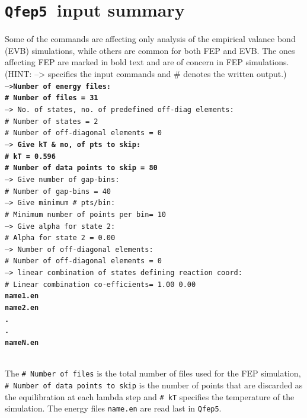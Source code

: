 \documentclass[a4paper,12pt]{article}
\newcommand{\qfep}{\texttt{Qfep5}}
\begin{document}
\section{\qfep\ input summary}

Some of the commands are affecting only analysis of the empirical
valance bond (EVB) simulations, while others are common for both
FEP and EVB. The ones affecting FEP are marked in bold text and
are of concern in FEP simulations.\\ (HINT: --> specifies the
input commands and \# denotes the written output.)\\

\noindent\texttt{-->\textbf{Number of energy files:\\
\# Number of files                 =    31}\\
--> No. of states, no. of predefined off-diag elements: \\
\# Number of states                 =     2\\
\# Number of off-diagonal elements =     0\\
--> \textbf{Give kT \& no, of pts to skip:}\\
\textbf{\# kT                              = 0.596}\\
\textbf{\# Number of data points to skip   =    80}\\
--> Give number of gap-bins: \\
\# Number of gap-bins              =    40\\
--> Give minimum \# pts/bin: \\
\# Minimum number of points per bin=    10\\
--> Give alpha for state  2:\\
\# Alpha for state  2              =  0.00\\
--> Number of off-diagonal elements:\\
\# Number of off-diagonal elements =     0\\
--> linear combination of states defining reaction coord: \\
\# Linear combination co-efficients=  1.00  0.00\\
\textbf{name1.en\\
name2.en\\
.\\
.\\
nameN.en\\}
}

The \texttt{\# Number of files} is the total number of files used
for the FEP simulation, \texttt{\# Number of data points to skip}
is the number of points that are discarded as the equilibration at
each lambda step and \texttt{\# kT} specifies the temperature of
the simulation. The energy files \texttt{name.en} are read last in
\qfep.
\end{document}
